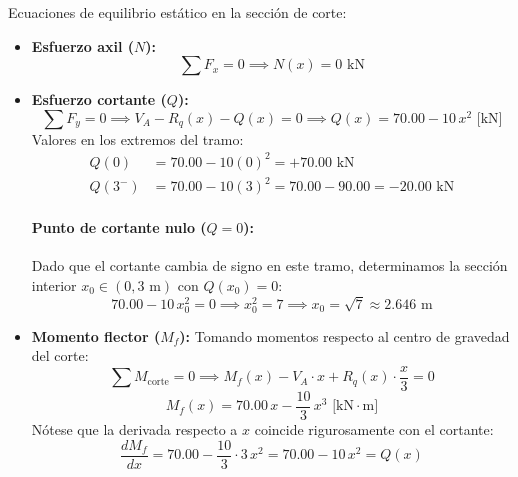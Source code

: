 Ecuaciones de equilibrio estático en la sección de corte:
\begin{itemize}
    \item \textbf{Esfuerzo axil ($N$):}
          \begin{equation}
              \sum F_x = 0 \implies \boxed{N(x) = 0\text{ kN}}
          \end{equation}

    \item \textbf{Esfuerzo cortante ($Q$):}
          \begin{equation}
              \sum F_y = 0 \implies V_A - R_q(x) - Q(x) = 0 \implies \boxed{Q(x) = 70.00 - 10\,x^2\text{ [kN]}}
          \end{equation}
          Valores en los extremos del tramo:
          \begin{align*}
              Q(0)   & = 70.00 - 10(0)^2 = \boxed{+70.00\text{ kN}}                 \\
              Q(3^-) & = 70.00 - 10(3)^2 = 70.00 - 90.00 = \boxed{-20.00\text{ kN}}
          \end{align*}

          \paragraph{Punto de cortante nulo ($Q = 0$):}
          Dado que el cortante cambia de signo en este tramo, determinamos la sección interior $x_0 \in (0, 3\text{ m})$ con $Q(x_0) = 0$:
          \begin{equation}
              70.00 - 10\,x_0^2 = 0 \implies x_0^2 = 7 \implies \boxed{x_0 = \sqrt{7} \approx 2.646\text{ m}}
          \end{equation}

    \item \textbf{Momento flector ($M_f$):}
          Tomando momentos respecto al centro de gravedad del corte:
          \begin{equation}
              \sum M_{\text{corte}} = 0 \implies M_f(x) - V_A \cdot x + R_q(x)\cdot \frac{x}{3} = 0
          \end{equation}
          \begin{equation}
              \boxed{M_f(x) = 70.00\,x - \frac{10}{3}\,x^3\text{ [kN}\cdot\text{m]}}
          \end{equation}
          Nótese que la derivada respecto a $x$ coincide rigurosamente con el cortante:
          \begin{equation}
              \frac{dM_f}{dx} = 70.00 - \frac{10}{3}\cdot 3\,x^2 = 70.00 - 10\,x^2 = Q(x)
          \end{equation}


\end{itemize}
